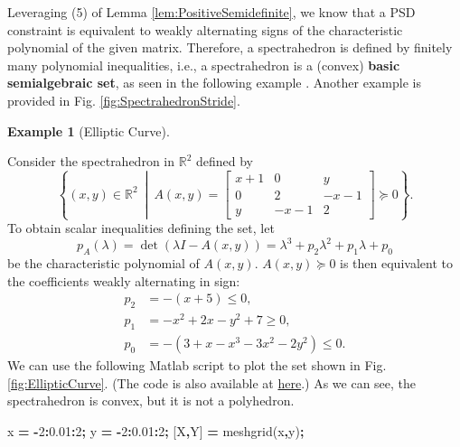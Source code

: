 \documentclass[
]{book}
\newenvironment{Shaded}{\begin{snugshade}}{\end{snugshade}}
\newcommand{\FloatTok}[1]{\textcolor[rgb]{0.00,0.00,0.81}{#1}}
\newcommand{\NormalTok}[1]{#1}
\newcommand{\OperatorTok}[1]{\textcolor[rgb]{0.81,0.36,0.00}{\textbf{#1}}}
\newcommand{\VariableTok}[1]{\textcolor[rgb]{0.00,0.00,0.00}{#1}}
\theoremstyle{definition}
\theoremstyle{definition}
\newtheorem{example}{Example}[chapter]
\theoremstyle{definition}
\theoremstyle{definition}
\theoremstyle{remark}
\begin{document}
Leveraging (5) of Lemma \ref{lem:PositiveSemidefinite}, we know that a PSD constraint is equivalent to weakly alternating signs of the characteristic polynomial of the given matrix. Therefore, a spectrahedron is defined by finitely many polynomial inequalities, i.e., a spectrahedron is a (convex) \textbf{basic semialgebraic set}, as seen in the following example \citep{blekherman12book-semidefinite}. Another example is provided in Fig. \ref{fig:SpectrahedronStride}.

\begin{example}[Elliptic Curve]
\protect\hypertarget{exm:EllipticCurve}{}\label{exm:EllipticCurve}

Consider the spectrahedron in \(\mathbb{R}^{2}\) defined by
\[
 \left\{ (x,y) \in \mathbb{R}^{2} \ \middle\vert\ A(x,y) = \begin{bmatrix} x+1 & 0 & y \\ 0 & 2 & -x-1 \\ y & -x-1 & 2 \end{bmatrix} \succeq 0  \right\} .
\]
To obtain scalar inequalities defining the set, let
\[
p_A(\lambda) = \det (\lambda I - A(x,y)) = \lambda^3 + p_2 \lambda^2 + p_1 \lambda + p_0
\]
be the characteristic polynomial of \(A(x,y)\). \(A(x,y) \succeq 0\) is then equivalent to the coefficients weakly alternating in sign:
\begin{equation}
\begin{split}
p_2 & = -(x+5) \leq 0, \\
p_1 & = -x^2 + 2x - y^2 + 7 \geq 0, \\
p_0 & = -(3+ x -x^3 -3x^2 - 2y^2) \leq 0.
\end{split}
\end{equation}
We can use the following Matlab script to plot the set shown in Fig. \ref{fig:EllipticCurve}. (The code is also available at \href{https://github.com/ComputationalRobotics/Semidefinite-Examples}{here}.) As we can see, the spectrahedron is convex, but it is not a polyhedron.

\begin{Shaded}
\begin{Highlighting}[]
\VariableTok{x} \OperatorTok{=} \OperatorTok{{-}}\FloatTok{2}\OperatorTok{:}\FloatTok{0.01}\OperatorTok{:}\FloatTok{2}\OperatorTok{;} 
\VariableTok{y} \OperatorTok{=} \OperatorTok{{-}}\FloatTok{2}\OperatorTok{:}\FloatTok{0.01}\OperatorTok{:}\FloatTok{2}\OperatorTok{;} 
\NormalTok{[}\VariableTok{X}\OperatorTok{,}\VariableTok{Y}\NormalTok{] }\OperatorTok{=} \VariableTok{meshgrid}\NormalTok{(}\VariableTok{x}\OperatorTok{,}\VariableTok{y}\NormalTok{)}\OperatorTok{;}


\end{Highlighting}
\end{Shaded}
\end{example}
\end{document}
